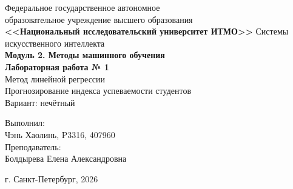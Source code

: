 \begin{titlepage}
\centering
Федеральное государственное автономное\\
образовательное учреждение высшего образования\\
\textbf{<<Национальный исследовательский университет ИТМО>>}
\vfill
Системы искусственного интеллекта\\[0.8em]
\textbf{Модуль 2. Методы машинного обучения}\\[1em]
\textbf{Лабораторная работа № 1}\\[0.8em]
Метод линейной регрессии\\[0.8em]
Прогнозирование индекса успеваемости студентов\\[0.8em]
Вариант: нечётный
\vfill
\begin{flushright}
Выполнил:\\
Чэнь Хаолинь, P3316, 407960\\[0.6em]
Преподаватель:\\
Болдырева Елена Александровна
\end{flushright}
\vspace{4em}
г. Санкт-Петербург, 2026
\end{titlepage}

